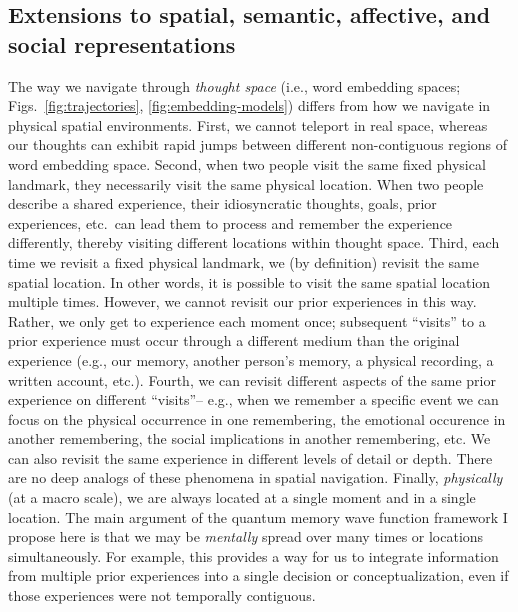 \documentclass{article}
\begin{document}
\subsection*{Extensions to spatial, semantic, affective, and social representations}
The way we navigate through \textit{thought space} (i.e., word embedding spaces; Figs.~\ref{fig:trajectories}, \ref{fig:embedding-models}) differs from how we navigate in physical spatial environments.  First, we cannot teleport in real space, whereas our thoughts can exhibit rapid jumps between different non-contiguous regions of word embedding space.  Second, when two people visit the same fixed physical landmark, they necessarily visit the same physical location.  When two people describe a shared experience, their idiosyncratic thoughts, goals, prior experiences, etc.\ can lead them to process and remember the experience differently, thereby visiting different locations within thought space.  Third, each time we revisit a fixed physical landmark, we (by definition) revisit the same spatial location.  In other words, it is possible to visit the same spatial location multiple times.  However, we cannot revisit our prior experiences in this way.  Rather, we only get to experience each moment once; subsequent ``visits'' to a prior experience must occur through a different medium than the original experience (e.g., our memory, another person’s memory, a physical recording, a written account, etc.).  Fourth, we can revisit different aspects of the same prior experience on different ``visits''-- e.g., when we remember a specific event we can focus on the physical occurrence in one remembering, the emotional occurence in another remembering, the social implications in another remembering, etc.  We can also revisit the same experience in different levels of detail or depth.  There are no deep analogs of these phenomena in spatial navigation.  Finally, \textit{physically} (at a macro scale), we are always located at a single moment and in a single location.  The main argument of the quantum memory wave function framework I propose here is that we may be \textit{mentally} spread over many times or locations simultaneously.  For example, this provides a way for us to integrate information from multiple prior experiences into a single decision or conceptualization, even if those experiences were not temporally contiguous.
\end{document}
